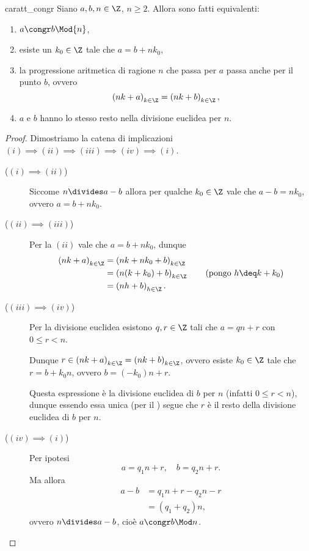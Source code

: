 \begin{proposition} {caratt_congr}
    Siano $a, b, n \in \Z$, $n \geq 2$. Allora sono fatti equivalenti:
    \begin{enumerate}[label={(\roman*)}]
        \item $a \congr b \Mod{n}$,
        \item esiste un $k_0 \in \Z$ tale che $a = b + nk_0$,
        \item la progressione aritmetica di ragione $n$ che passa per $a$ passa anche per il punto $b$, ovvero \[
            \left(nk + a\right)_{k \in \Z} = \left(nk + b\right)_{k \in \Z},
        \]
        \item $a$ e $b$ hanno lo stesso resto nella divisione euclidea per $n$.
    \end{enumerate}
\end{proposition}
\begin{proof}
    Dimostriamo la catena di implicazioni $(i) \implies (ii) \implies (iii) \implies (iv) \implies (i)$.
    \begin{description}
        \item[($(i) \implies (ii)$)] Siccome $n \divides a-b$ allora per qualche $k_0 \in \Z$ vale che $a-b = nk_0$, ovvero $a = b + nk_0$.
        \item[($(ii) \implies (iii)$)] Per la $(ii)$ vale che $a = b+nk_0$, dunque \begin{align*}
            \left(nk + a\right)_{k \in \Z} &= \left(nk + nk_0 + b\right)_{k \in \Z} \\
            &= \left(n(k + k_0) + b\right)_{k \in \Z} \tag{pongo $h \deq k + k_0$}\\
            &= \left(nh + b\right)_{h \in \Z}.
        \end{align*}
        \item[($(iii) \implies (iv)$)] Per la divisione euclidea esistono $q, r \in \Z$ tali che $a = qn + r$ con $0 \leq r < n$.
        
        Dunque $r \in \left(nk + a\right)_{k \in \Z} = \left(nk + b\right)_{k \in \Z}$, ovvero esiste $k_0 \in \Z$ tale che $r = b + k_0n$, ovvero $b = (-k_0)n + r$. 

        Questa espressione è la divisione euclidea di $b$ per $n$ (infatti $0 \leq r < n$), dunque essendo essa unica (per il ) segue che $r$ è il resto della divisione euclidea di $b$ per $n$.
        \item[($(iv) \implies (i)$)] Per ipotesi \[
            a = q_1n + r, \quad b = q_2n + r.    
        \] Ma allora \begin{align*}
            a - b &= q_1n + r - q_2n - r\\
            &= (q_1 + q_2)n,
        \end{align*} ovvero $n \divides a - b$, cioè $a \congr b \Mod n$. \qedhere
    \end{description}
\end{proof}

